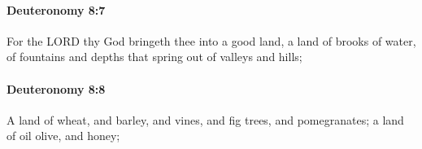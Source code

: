 		\paragraph{Deuteronomy 8:7} %
			\label{DEUTERONOMY-8-7}

			For the LORD thy God bringeth thee into a good land, a land of brooks of water, of fountains and depths that spring out of valleys and hills;


		\paragraph{Deuteronomy 8:8} %
			\label{DEUTERONOMY-8-8}

			A land of wheat, and barley, and vines, and fig trees, and pomegranates; a land of oil olive, and honey;


